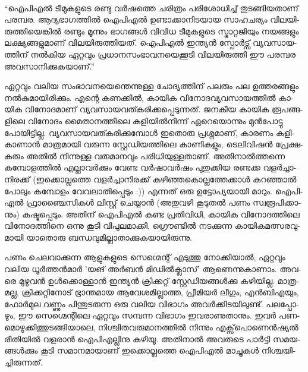 \vskip 2pt

‌\begin{framed}
``ഐ­പി­എല്‍ ടീ­മു­ക­ളു­ടെ രണ്ടു വര്‍­ഷ­ത്തെ ചരി­ത്രം പരി­ശോ­ധി­ച്ച് തു­ട­ങ്ങി­യ­താ­ണ് പര­മ്പ­ര. ആദ്യഭാഗത്തില്‍ ഐ­പി­എല്‍ 
ഉണ്ടാ­ക്കാ­നി­ട­യായ സാ­ഹ­ച­ര്യം വി­ല­യി­രു­ത്തി­യെ­ങ്കില്‍ രണ്ടും മൂന്നും ഭാ­ഗ­ങ്ങള്‍ വി­വിധ ടീ­മു­ക­ളു­ടെ സ്ട്രാ­റ്റ­ജി­യും നയ­ങ്ങ­ളും 
ലക്ഷ്യ­ങ്ങ­ളു­മാ­ണ് വി­ല­യി­രു­ത്തി­യ­ത്. ഐപി­എല്‍ ഇന്ത്യന്‍ സ്പോര്‍­ട്സ് വ്യ­വ­സാ­യ­ത്തി­ന് നല്‍­കിയ ഏറ്റ­വും 
പ്ര­ധാ­ന­സം­ഭാ­വ­ന­യെ­ക്കൂ­ടി വി­ല­യി­രു­ത്തി ഈ ­പ­ര­മ്പ­ര അവ­സാ­നി­ക്കു­ക­യാ­ണ്.''
\end{framed}

{\vskip 12pt}

ഏ­റ്റ­വും വലിയ സം­ഭാ­വ­ന­യെ­ന്തെ­ന്നു­ള്ള ചോ­ദ്യ­ത്തി­ന് പല­രും പല ഉത്ത­ര­ങ്ങ­ളും നല്‍­കു­മാ­യി­രി­ക്കും. എന്റെ കണ­ക്കില്‍, 
കാ­യിക വി­നോ­ദ­വ്യ­വ­സാ­യ­ത്തില്‍ കാ­യിക വി­നോ­ദ­മാ­ണ് വ്യ­വ­സാ­യ­വ­ത്ക­രി­ക്ക­പ്പെ­ടു­ന്ന­ത്. ജന­കീയ കാ­യിക രൂ­പ­ങ്ങ­ളി­ലെ 
­വി­നോ­ദം­ മൈ­താ­ന­ത്തി­ലെ കളി­യില്‍­നി­ന്ന് ഏറെ­യൊ­ന്നും മുന്‍­പോ­ട്ടു പോ­യി­ട്ടി­ല്ല. വ്യ­വ­സാ­യ­വ­ത്ക­രി­ക്കു­മ്പോള്‍ ഇതൊ­രു 
പ്ര­ശ്ന­മാ­ണ്, കാ­ര­ണം കളി­കാ­ണാന്‍ മാ­ത്ര­മാ­യി വരു­ന്ന സ്റ്റേ­ഡി­യ­ത്തി­ലെ കാ­ണി­ക­ളും, ­ടെ­ലി­വി­ഷന്‍ പ്രേ­ക്ഷ­ക­രും അതില്‍ 
നി­ന്നു­ള്ള വരു­മാ­ന­വും പരി­ധി­യു­ള്ള­താ­ണ്. അതി­നാല്‍­ത്ത­ന്നെ കമ്പോ­ള­ത്തില്‍ എല്ലാ­വര്‍­ക്കും വേ­ണ്ട വര്‍­ഷാ­വര്‍­ഷം പു­തു­ക്കിയ 
രണ്ട­ക്ക വളര്‍­ച്ചാ­നി­ര­ക്ക് (ഇ­ക്കൊ­ല്ല­ത്തെ വളര്‍­ച്ചാ­നി­ര­ക്ക് കഴി­ഞ്ഞ­കൊ­ല്ല­ത്തേ­ക്കാള്‍ കു­റ­ഞ്ഞാല്‍ പോ­ലും കമ്പോ­ളം 
വേ­വ­ലാ­തി­പ്പെ­ടും :)) എന്ന­ത് ഒരു ഉട്ടോ­പ്യ­യാ­യി മാ­റും. ഐപി­എല്‍ ഫ്രാ­ഞ്ചൈ­സി­കള്‍ ലി­സ്റ്റ് ചെ­യ്യാന്‍ (അ­തു­വ­ഴി കൂ­ടു­തല്‍ 
പണം സ്വ­രൂ­പി­ക്കാ­നും) കഷ്ട­പ്പെ­ടും. അതി­ന് ഐപി­എല്‍ കണ്ട പ്ര­തി­വി­ധി, കാ­യിക വി­നോ­ദ­ത്തി­ലെ വി­നോ­ദ­ത്തി­നെ ഒന്നു 
കൂ­ടി വി­പു­ല­മാ­ക്കി, ഗ്രൌ­ണ്ടില്‍ നട­ക്കു­ന്ന കാ­യി­ക­മ­ത്സ­ര­വു­മാ­യി യാ­തൊ­രു ബന്ധ­വു­മി­ല്ലാ­താ­ക്കു­ക­യാ­യി­രു­ന്നു­.

­പ­ണം ചെ­ല­വാ­ക്കു­ന്ന ആളു­ക­ളു­ടെ സെ­ഗ്മെ­ന്റ് എടു­ത്തു നോ­ക്കി­യാല്‍, ഏറ്റ­വും വലിയ ധൂര്‍­ത്തന്‍­മാര്‍ 'യ­ങ് അര്‍­ബന്‍ 
മി­ഡില്‍­ക്ലാ­സ്' ആണെ­ന്നു­കാ­ണാം. അവ­രെ മു­ഴു­വന്‍ ഉള്‍­ക്കൊ­ള്ളാന്‍ ഇന്ത്യന്‍ ­ക്രി­ക്ക­റ്റ് സ്റ്റേ­ഡി­യ­ങ്ങള്‍­ക്കു കഴി­യി­ല്ല. മാ­ത്ര­മ­ല്ല, 
ക്രി­ക്ക­റ്റി­നോ­ട് ഭ്രാ­ന്ത­മായ ആവേ­ശ­മി­ല്ലാ­ത്ത, പ്രീ­മി­യര്‍ ലീ­ഗും, എന്‍­ബി­എ­യും, ഫോര്‍­മുല വണ്ണും പി­ന്തു­ട­രു­ന്ന ഒരു വലിയ വി­ഭാ­ഗം 
അവര്‍­ക്കി­ട­യി­ലു­ണ്ട്. പല­പ്പോ­ഴും, ഈ സെ­ഗ്മെ­ന്റി­ലെ ഏറ്റ­വും സമ്പ­ന്ന വി­ഭാ­ഗം ഇവ­രാ­ണു­താ­നും. ഇവര്‍ 
പണ­മൊ­ഴു­ക്കി­ത്തു­ട­ങ്ങി­യാ­ലെ, നി­ശ്ചി­ത­വ­രു­മാ­ന­ത്തില്‍ നി­ന്നും എക്സ്‌­പൊ­ണെന്‍­ഷ്യല്‍ രീ­തി­യില്‍ വള­രാന്‍ ഐപി­എ­ല്ലി­നു 
കഴി­യൂ. അതി­നാല്‍ അവ­രു­ടെ ­പാര്‍­ട്ടി­ സമ­യ­ങ്ങള്‍­ക്കും കൂ­ടി സമാ­ന­മാ­യാ­ണ് ഇക്കൊ­ല്ല­ത്തെ ഐപി­എല്‍ മാ­ച്ചു­കള്‍ 
നി­ശ്ച­യി­ച്ചി­രു­ന്ന­ത്.

